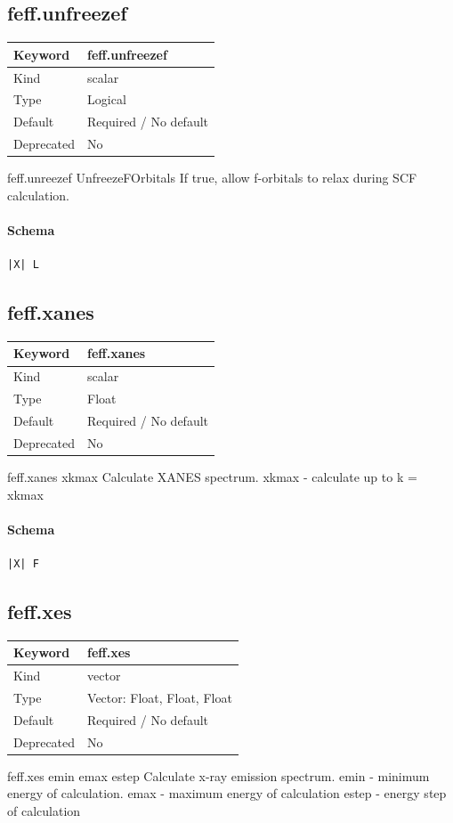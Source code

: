 \documentclass[11pt]{article}
\begin{document}
{{{{\subsection{feff.unfreezef}
\label{kw:feff-unfreezef}
\begin{longtable}{|p{1.5in}|p{4.5in}|}
\hline
Keyword & feff.unfreezef \\
\hline
Kind & scalar \\
\hline
Type & Logical \\
\hline
Default & Required / No default \\
\hline
Deprecated & No \\
\hline
\end{longtable}
 feff.unreezef{ UnfreezeFOrbitals }
 If true, allow f-orbitals to relax during SCF calculation.

\paragraph{Schema}
\begin{Verbatim}
|X| L
\end{Verbatim}

\subsection{feff.xanes}
\label{kw:feff-xanes}
\begin{longtable}{|p{1.5in}|p{4.5in}|}
\hline
Keyword & feff.xanes \\
\hline
Kind & scalar \\
\hline
Type & Float \\
\hline
Default & Required / No default \\
\hline
Deprecated & No \\
\hline
\end{longtable}
 feff.xanes{ xkmax }
 Calculate XANES spectrum.
   xkmax - calculate up to k = xkmax

\paragraph{Schema}
\begin{Verbatim}
|X| F
\end{Verbatim}

\subsection{feff.xes}
\label{kw:feff-xes}
\begin{longtable}{|p{1.5in}|p{4.5in}|}
\hline
Keyword & feff.xes \\
\hline
Kind & vector \\
\hline
Type & Vector: Float, Float, Float \\
\hline
Default & Required / No default \\
\hline
Deprecated & No \\
\hline
\end{longtable}
 feff.xes{ emin emax estep }
 Calculate x-ray emission spectrum.
   emin  - minimum energy of calculation.
   emax  - maximum energy of calculation
   estep - energy step of calculation

}}}}
\end{document}
